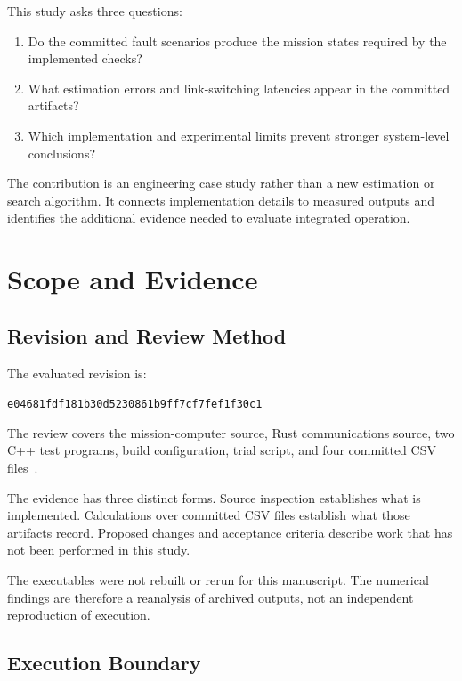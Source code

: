 \documentclass[conference]{IEEEtran}
\newcommand{\revision}{
  \nolinkurl{e04681fdf181b30d5230861b9ff7cf7fef1f30c1}
}
\begin{document}
This study asks three questions:
\begin{enumerate}
  \item Do the committed fault scenarios produce the mission
  states required by the implemented checks?
  \item What estimation errors and link-switching latencies
  appear in the committed artifacts?
  \item Which implementation and experimental limits prevent
  stronger system-level conclusions?
\end{enumerate}

The contribution is an engineering case study rather than a
new estimation or search algorithm. It connects implementation
details to measured outputs and identifies the additional
evidence needed to evaluate integrated operation.

\section{Scope and Evidence}

\subsection{Revision and Review Method}

The evaluated revision is:
\begin{center}
\begin{minipage}{0.97\columnwidth}
\footnotesize\revision
\end{minipage}
\end{center}

The review covers the mission-computer source, Rust
communications source, two C++ test programs, build
configuration, trial script, and four committed CSV
files~\cite{mission,comms,data,tests}.

The evidence has three distinct forms. Source inspection
establishes what is implemented. Calculations over committed
CSV files establish what those artifacts record. Proposed
changes and acceptance criteria describe work that has not
been performed in this study.

The executables were not rebuilt or rerun for this manuscript.
The numerical findings are therefore a reanalysis of archived
outputs, not an independent reproduction of execution.

\subsection{Execution Boundary}
\end{document}
